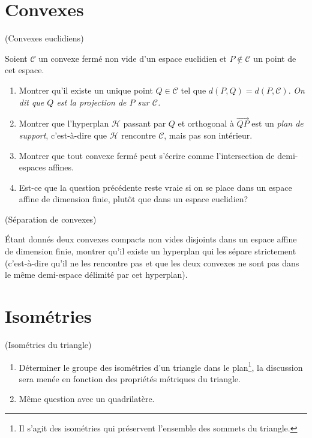 \documentclass[a4paper,12pt,reqno]{amsart}
\begin{document}
\section{Convexes}

\begin{exo} (Convexes euclidiens)

    Soient $\mathcal{C}$ un convexe fermé non vide d'un espace euclidien et $P \notin \mathcal{C}$ un point de cet espace.
    \begin{enumerate}
       \item Montrer qu'il existe un unique point $Q \in \mathcal{C}$ tel que $d(P,Q) = d(P,\mathcal{C})$. \newline
       \emph{On dit que $Q$ est la projection de $P$ sur $\mathcal{C}$.}

       \item Montrer que l'hyperplan $\mathcal{H}$ passant par $Q$ et orthogonal à $\overrightarrow{QP}$ est un \emph{plan de support}, c'est-à-dire que $\mathcal{H}$ rencontre $\mathcal{C}$, mais pas son intérieur.

       \item Montrer que tout convexe fermé peut s'écrire comme l'intersection de demi-espaces affines.

       \item Est-ce que la question précédente reste vraie si on se place dans un espace affine de dimension finie, plutôt que dans un espace euclidien?
     \end{enumerate}
\end{exo}

\begin{exo} (Séparation de convexes)

  Étant donnés deux convexes compacts non vides disjoints dans un espace affine de dimension finie, montrer qu'il existe un hyperplan qui les sépare strictement (c'est-à-dire qu'il ne les rencontre pas et que les deux convexes ne sont pas dans le même demi-espace délimité par cet hyperplan).
\end{exo}


\section{Isométries}
\begin{exo} (Isométries du triangle)
  \begin{enumerate}
    \item Déterminer le groupe des isométries d'un triangle dans le plan\footnote{Il s'agit des isométries qui préservent l'ensemble des sommets du triangle.}, la discussion sera menée en fonction des propriétés métriques du triangle.
    \item Même question avec un quadrilatère.
  \end{enumerate}
\end{exo}
\end{document}
